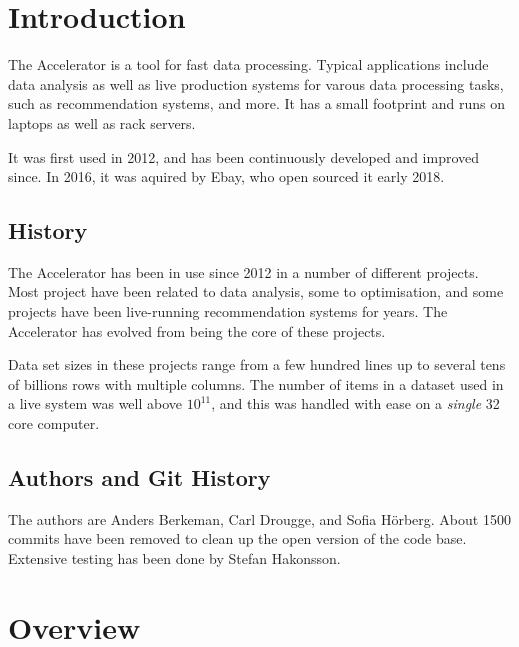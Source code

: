 \documentclass[a4paper]{article}
\begin{document}
\clearpage

\section{Introduction}
The Accelerator is a tool for fast data processing.  Typical
applications include data analysis as well as live production systems
for varous data processing tasks, such as recommendation systems, and
more.  It has a small footprint and runs on laptops as well as rack
servers.

It was first used in 2012, and has been continuously developed and
improved since.  In 2016, it was aquired by Ebay, who open sourced it
early 2018.



\subsection{History}
The Accelerator has been in use since 2012 in a number of different
projects.  Most project have been related to data analysis, some to
optimisation, and some projects have been live-running recommendation
systems for years.  The Accelerator has evolved from being the core of
these projects.

Data set sizes in these projects range from a few hundred lines up to
several tens of billions rows with multiple columns.  The number of
items in a dataset used in a live system was well above $10^{11}$, and
this was handled with ease on a \emph{single} 32 core computer.


\subsection{Authors and Git History}
The authors are Anders Berkeman, Carl Drougge, and Sofia H\"orberg.
About 1500 commits have been removed to clean up the open version of
the code base.  Extensive testing has been done by Stefan Hakonsson.


\clearpage
\section{Overview}
\end{document}
